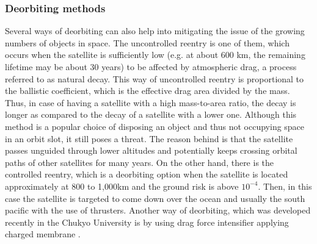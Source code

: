\bigskip
\subsubsection{Deorbiting methods}
Several ways of deorbiting can also help into mitigating the issue of the growing numbers of objects in space. The uncontrolled reentry is one of them, which occurs when the satellite is sufficiently low (e.g. at about 600 km, the remaining lifetime may be about 30 years) to be affected by atmospheric drag, a process referred to as natural decay. This way of uncontrolled reentry is proportional to the ballistic coefficient, which is the effective drag area divided by the mass. Thus, in case of having a satellite with a high mass-to-area ratio, the decay is longer as compared to the decay of a satellite with a lower one. Although this method is a popular choice of disposing an object and thus not occupying space in an orbit slot, it still poses a threat. The reason behind is that the satellite passes unguided through lower altitudes and potentially keeps crossing orbital paths of other satellites for many years. On the other hand, there is the controlled reentry, which is a deorbiting option when the satellite is located approximately at 800 to 1,000km and the ground risk is above $10^{-4}$. Then, in this case the satellite is targeted to come down over the ocean and usually the south pacific with the use of thrusters. Another way of deorbiting, which was developed recently in the Chukyo University is by using drag force intensifier applying charged membrane \cite{muranaka}.


\bigskip
